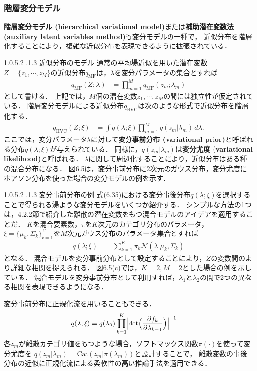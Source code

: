 \documentclass[11pt,a4paper]{jsarticle}
\makeatletter
\numberwithin{equation}{section}
\newcommand{\subsubsubsection}{\@startsection{paragraph}{4}{\z@}%
	{1.0\Cvs \@plus.5\Cdp \@minus.2\Cdp}%
	{.1\Cvs \@plus.3\Cdp}%
	{\reset@font\sffamily\normalsize}
}
\makeatother
\begin{document}
\subsubsection{階層変分モデル}
\textbf{階層変分モデル (hierarchical variational model)}または\textbf{補助潜在変数法 (auxiliary latent variables method)}も変分モデルの一種で，
近似分布を階層化することにより，複雑な近似分布を表現できるように拡張されている．

\subsubsubsection{近似分布のモデル}
通常の平均場近似を用いた潜在変数$Z = \{ z_1, \cdots, z_M \}$の近似分布$q_{\mathrm{MF}}$は，$\lambda$を変分パラメータの集合とすれば
\begin{align}
q_{\mathrm{MF}} (Z; \lambda)
& =
\prod_{m=1}^M q_{\mathrm{MF}} (z_m; \lambda_m)
\end{align}
として書ける．
上記では，$M$個の潜在変数$z_1, \cdots, z_M$の間には独立性が仮定されている．
階層変分モデルによる近似分布$q_{\mathrm{HVC}}$は次のような形式で近似分布を階層化する．
\begin{align}
q_{\mathrm{HVC}} (Z; \xi)
& =
\int q(\lambda; \xi) \prod_{m=1}^M q (z_m | \lambda_m) \, d \lambda.
\end{align}
ここでは，変分パラメータ$\lambda$に対して\textbf{変分事前分布 (variational prior)}と呼ばれる分布$q(\lambda; \xi)$が与えられている．
同様に，$q (z_m | \lambda_m)$は\textbf{変分尤度 (variational likelihood)}と呼ばれる．
$\lambda$に関して周辺化することにより，近似分布はある種の混合分布になる．
図6.5は，変分事前分布に2次元のガウス分布，変分尤度にポアソン分布を使った場合の変分モデルの例を示す．

\subsubsubsection{変分事前分布の例}
式(6.35)における変分事後分布$q(\lambda; \xi)$を選択することで得られる湯ような変分モデルをいくつか紹介する．
シンプルな方法の1つは，4.2.2節で紹介した離散の潜在変数をもつ混合モデルのアイデアを適用することだ．
$K$を混合要素数，$\pi$を$K$次元のカテゴリ分布のパラメータ，$\xi = \{ \mu_k, \Sigma_k \}_{k=1}^K$を$M$次元ガウス分布のパラメータ集合とすれば
\begin{align}
q(\lambda; \xi)
& =
\sum_{k=1}^K \pi_k \mathcal{N}(\lambda | \mu_k, \Sigma_k)
\end{align}
となる．
混合モデルを変分事前分布として設定することにより，$Z$の変数間のより詳細な相関を捉えられる．
図6.5(c)では，$K = 2, M = 2$とした場合の例を示している．
混合モデルを変分事前分布として利用すれば，$\lambda_1$と$\lambda_2$の間で2つの異なる相関を表現できるようになる．

変分事前分布に正規化流を用いることもできる．
\begin{align}
q(\lambda; \xi)
& =
q(\lambda_0) \prod_{k=1}^K \Bigl| \mathrm{det} \Bigl(\frac{\partial f_k}{\partial \lambda_{k-1}} \Bigr) \Bigr|^{-1}.
\end{align}
各$z_m$が離散カテゴリ値をもつような場合，ソフトマックス関数$\pi (\cdot)$を使って変分尤度を
$q(z_m | \lambda_m) = \mathrm{Cat}(z_m | \pi(\lambda_m))$と設計することで，
離散変数の事後分布の近似に正規化流による柔軟性の高い推論手法を適用できる．
\end{document}
